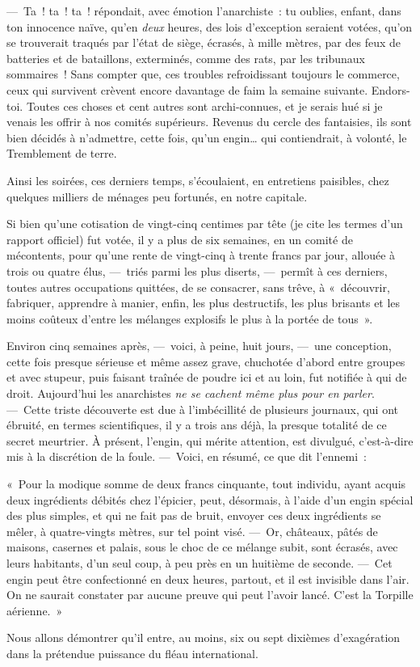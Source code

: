 \documentclass[french,twoside]{book} %
\begin{document}
— Ta ! ta ! ta ! répondait, avec émotion l’anarchiste : tu oublies, enfant, dans ton innocence naïve, qu’en \emph{deux} heures, des lois d’exception seraient votées, qu’on se trouverait traqués par l’état de siège, écrasés, à mille mètres, par des feux de batteries et de bataillons, exterminés, comme des rats, par les tribunaux sommaires ! Sans compter que, ces troubles refroidissant toujours le commerce, ceux qui survivent crèvent encore davantage de faim la semaine suivante. Endors-toi. Toutes ces choses et cent autres sont archi-connues, et je serais hué si je   venais les offrir à nos comités supérieurs. Revenus du cercle des fantaisies, ils sont bien décidés à n’admettre, cette fois, qu’un engin… qui contiendrait, à volonté, le Tremblement de terre.\par
Ainsi les soirées, ces derniers temps, s’écoulaient, en entretiens paisibles, chez quelques milliers de ménages peu fortunés, en notre capitale.\par
Si bien qu’une cotisation de vingt-cinq centimes par tête (je cite les termes d’un rapport officiel) fut votée, il y a plus de six semaines, en un comité de mécontents, pour qu’une rente de vingt-cinq à trente francs par jour, allouée à trois ou quatre élus, — triés parmi les plus diserts, — permît à ces derniers, toutes autres occupations quittées, de se consacrer, sans trêve, à « découvrir, fabriquer, apprendre à manier, enfin, les plus destructifs, les plus brisants et les moins coûteux d’entre les mélanges explosifs le plus à la portée de tous ».\par
Environ cinq semaines après, — voici, à peine, huit jours, — une conception, cette fois presque sérieuse et même assez grave, chuchotée d’abord   entre groupes et avec stupeur, puis faisant traînée de poudre ici et au loin, fut notifiée à qui de droit. Aujourd’hui les anarchistes \emph{ne se cachent même plus pour en parler}. — Cette triste découverte est due à l’imbécillité de plusieurs journaux, qui ont ébruité, en termes scientifiques, il y a trois ans déjà, la presque totalité de ce secret meurtrier. À présent, l’engin, qui mérite attention, est divulgué, c’est-à-dire mis à la discrétion de la foule. — Voici, en résumé, ce que dit l’ennemi :\par
« Pour la modique somme de deux francs cinquante, tout individu, ayant acquis deux ingrédients débités chez l’épicier, peut, désormais, à l’aide d’un engin spécial des plus simples, et qui ne fait pas de bruit, envoyer ces deux ingrédients se mêler, à quatre-vingts mètres, sur tel point visé. — Or, châteaux, pâtés de maisons, casernes et palais, sous le choc de ce mélange subit, sont écrasés, avec leurs habitants, d’un seul coup, à peu près en un huitième de seconde. — Cet engin peut être confectionné en deux heures, partout, et il est   invisible dans l’air. On ne saurait constater par aucune preuve qui peut l’avoir lancé. C’est la Torpille aérienne. »\par
Nous allons démontrer qu’il entre, au moins, six ou sept dixièmes d’exagération dans la prétendue puissance du fléau international.
\end{document}
